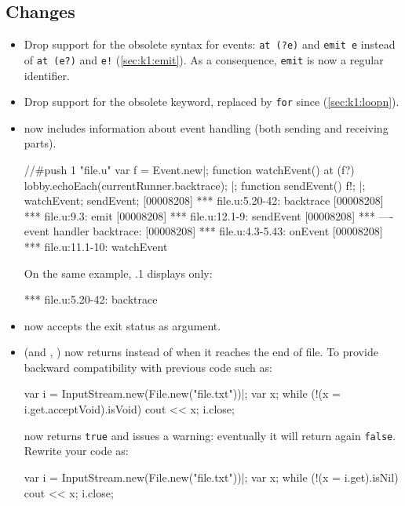 \subsection{Changes}
\begin{itemize}
\item Drop support for the obsolete  syntax for events:
  \lstinline{at (?e)} and \lstinline{emit e} instead of \lstinline{at (e?)}
  and \lstinline{e!}  (\autoref{sec:k1:emit}).  As a consequence,
  \lstinline|emit| is now a regular identifier.

\item Drop support for the obsolete  keyword, replaced by
  \lstinline{for} since  (\autoref{sec:k1:loopn}).

\item {} now includes information about event handling
  (both sending and receiving parts).

\begin{urbiscript}
//#push 1 "file.u"
var f = Event.new|;
function watchEvent()
{
  at (f?)
    lobby.echoEach(currentRunner.backtrace);
}|;
function sendEvent()
{
  f!;
}|;
watchEvent;
sendEvent;
[00008208] *** file.u:5.20-42: backtrace
[00008208] *** file.u:9.3: emit
[00008208] *** file.u:12.1-9: sendEvent
[00008208] *** ---- event handler backtrace:
[00008208] *** file.u:4.3-5.43: onEvent
[00008208] *** file.u:11.1-10: watchEvent
\end{urbiscript}

  On the same example, .1 displays only:
\begin{urbiunchecked}
[00000030] *** file.u:5.20-42: backtrace
\end{urbiunchecked}

\item {} now accepts the exit status as argument.

\item {} (and ,
  ) now returns  instead of
   when it reaches the end of file.  To provide backward
  compatibility with previous code such as:
\begin{urbiunchecked}
var i = InputStream.new(File.new("file.txt"))|;
var x;
while (!(x = i.get.acceptVoid).isVoid)
  cout << x;
i.close;
\end{urbiunchecked}
   now returns \lstinline|true| and issues a warning:
  eventually it will return again \lstinline|false|.  Rewrite your code as:
\begin{urbiunchecked}
var i = InputStream.new(File.new("file.txt"))|;
var x;
while (!(x = i.get).isNil)
  cout << x;
i.close;
\end{urbiunchecked}


\end{itemize}
